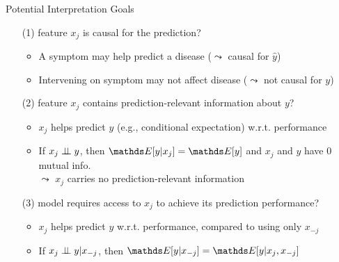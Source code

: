 \documentclass[10pt,compress,t,notes=noshow, xcolor=table]{beamer}
\begin{document}
\begin{frame}{Potential Interpretation Goals}
\begin{enumerate}
   \item[(1)] feature $x_j$ is causal for the prediction?
          \begin{itemize}
          \item A symptom may help predict a disease ($\leadsto$ causal for $\hat{y}$) %
          \item Intervening on symptom may not affect disease ($\leadsto$ not causal for $y$)
      \end{itemize}
    \item[(2)] feature $x_j$ contains prediction-relevant information about $y$?
    \begin{itemize}
      \item $x_j$ helps predict $y$ (e.g., conditional expectation) w.r.t. performance 
      \item If $x_j \perp \!\!\! \perp y$, then $\E[y|x_j] = \E[y]$ and $x_j$ and $y$ have 0 mutual info.\\ %
      $\leadsto$ $x_j$ carries no prediction-relevant information
    \end{itemize}
    \item[(3)] model requires access to $x_j$ to achieve its prediction performance?
    \begin{itemize}
      \item $x_{j}$ helps predict $y$ w.r.t. performance, compared to using only $x_{-j}$  %
      \item If $x_j \perp \!\!\! \perp y | x_{-j}$, then $\E[y|x_{-j}] = \E[y|x_j, x_{-j}]$ \\

\end{itemize}
\end{enumerate}
\end{frame}
\end{document}
